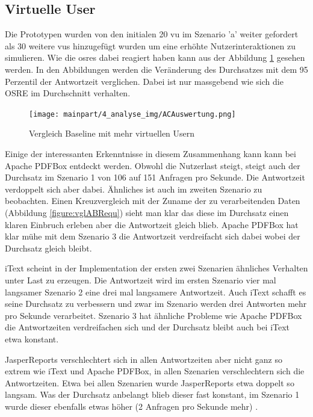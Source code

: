 \documentclass[main.tex]{subfiles}
\begin{document}
\subsection{Virtuelle User}
Die Prototypen wurden  von den initialen 20 \acrfull{vu} im Szenario 'a' weiter gefordert als 30 weitere \acrshort{vu}s hinzugefügt wurden um eine erhöhte Nutzerinteraktionen zu simulieren. Wie die \acrlong{osre}s dabei reagiert haben kann aus der Abbildung \ref{figure:vglACVU} gesehen werden. In den Abbildungen werden die Veränderung des Durchsatzes mit dem 95 Perzentil der Antwortzeit verglichen. Dabei ist nur massgebend wie sich die OSRE im Durchschnitt verhalten. 

\begin{figure}[!ht]
\texttt{[image: mainpart/4\_analyse\_img/ACAuswertung.png]}
 \caption{Vergleich Baseline mit mehr virtuellen Usern}
 \label{figure:vglACVU}
\end{figure}

Einige der interessanten Erkenntnisse in diesem Zusammenhang kann kann bei Apache PDFBox entdeckt werden. Obwohl die Nutzerlast steigt, steigt auch der Durchsatz im Szenario 1 von 106 auf 151 Anfragen pro Sekunde. Die Antwortzeit verdoppelt sich aber dabei. Ähnliches ist auch im zweiten Szenario zu beobachten. Einen Kreuzvergleich mit der Zuname der zu verarbeitenden Daten (Abbildung \ref{figure:vglABRequ}) sieht man klar das diese im Durchsatz einen klaren Einbruch erleben aber die Antwortzeit gleich blieb. Apache PDFBox hat klar mühe mit dem Szenario 3 die Antwortzeit verdreifacht sich dabei wobei der Durchsatz gleich bleibt.

iText scheint in der Implementation der ersten zwei Szenarien ähnliches Verhalten unter Last zu erzeugen. Die Antwortzeit wird im ersten Szenario vier mal langsamer Szenario 2 eine drei mal langsamere Antwortzeit. Auch iText schafft es seine Durchsatz zu verbessern und zwar im Szenario werden drei Antworten mehr pro Sekunde verarbeitet. Szenario 3 hat ähnliche Probleme wie Apache PDFBox die Antwortzeiten verdreifachen sich und der Durchsatz bleibt auch bei iText etwa konstant.

JasperReports verschlechtert sich in allen Antwortzeiten aber nicht ganz so extrem wie iText und Apache PDFBox, in allen Szenarien verschlechtern sich die Antwortzeiten. Etwa bei allen Szenarien wurde JasperReports etwa doppelt so langsam. Was der Durchsatz anbelangt blieb dieser fast konstant, im Szenario 1 wurde dieser ebenfalls etwas höher (2 Anfragen pro Sekunde mehr) . 
\end{document}
